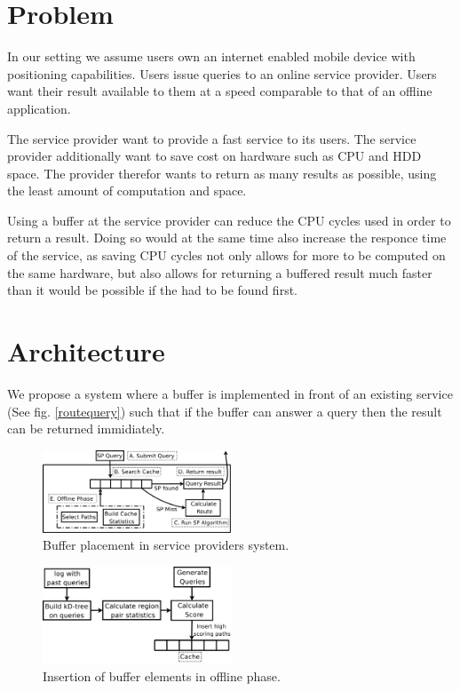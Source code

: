 \section{Problem}\label{sec:problemdef}

In our setting we assume users own an internet enabled mobile device with positioning capabilities. Users issue \spath queries to an online service provider. Users want their \spath result available to them at a speed comparable to that of an offline application.

The \spath service provider want to provide a fast service to its users. The service provider additionally want to save cost on hardware such as CPU and HDD space. The \spath provider therefor wants to return as many \spath results as possible, using the least amount of computation and space.

Using a \spath buffer at the \spath service provider can reduce the CPU cycles used in order to return a \spath result. Doing so would at the same time also increase the responce time of the \spath service, as saving CPU cycles not only allows for more \spaths to be computed on the same hardware, but also allows for returning a buffered result much faster than it would be possible if the \spath had to be found first.

\section{Architecture}
We propose a system where a \spath buffer is implemented in front of an existing \spath service (See fig. \ref{routequery}) such that if the buffer can answer a query then the result can be returned immidiately.

\begin{figure}
  \center
        \includegraphics[width=0.5\textwidth]{figures/routequery}
        \caption{Buffer placement in \spath service providers system.}
  \label{fig:routequery}
\end{figure}

\begin{figure}
  \center
        \includegraphics[width=0.5\textwidth]{figures/fillcache}
        \caption{Insertion of buffer elements in offline phase.}
  \label{fig:routequery}
\end{figure}



